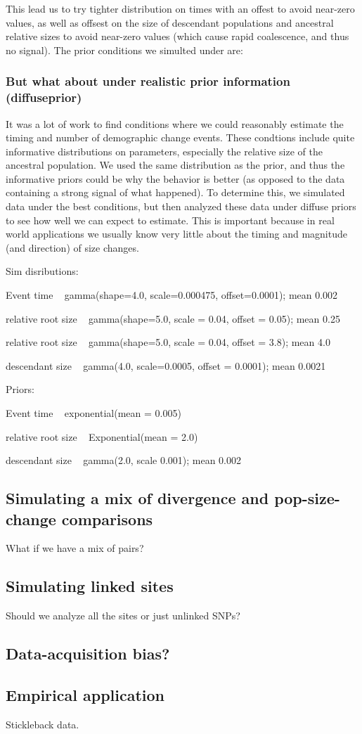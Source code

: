 This lead us to try tighter distribution on times with an offest to avoid
near-zero values, as well as offsest on the size of descendant populations and
ancestral relative sizes to avoid near-zero values (which cause rapid
coalescence, and thus no signal). The prior conditions we simulted under are:


\subsubsection{But what about under realistic prior information (diffuseprior)}

It was a lot of work to find conditions where we could reasonably estimate
the timing and number of demographic change events.
These condtions include quite informative distributions on parameters,
especially the relative size of the ancestral population.
We used the same distribution as the prior, and thus the informative priors
could be why the behavior is better (as opposed to the data containing a strong
signal of what happened).
To determine this, we simulated data under the best conditions,
but then analyzed these data under diffuse priors to see how
well we can expect to estimate.
This is important because in real world applications we usually know very
little about the timing and magnitude (and direction) of size changes.

Sim disributions:

Event time ~ gamma(shape=4.0, scale=0.000475, offset=0.0001); mean 0.002

relative root size ~ gamma(shape=5.0, scale = 0.04, offset = 0.05); mean 0.25

relative root size ~ gamma(shape=5.0, scale = 0.04, offset = 3.8); mean 4.0

descendant size ~ gamma(4.0, scale=0.0005, offset = 0.0001); mean 0.0021

Priors:

Event time ~ exponential(mean = 0.005)

relative root size ~ Exponential(mean = 2.0)

descendant size ~ gamma(2.0, scale 0.001); mean 0.002


\subsection{Simulating a mix of divergence and pop-size-change comparisons}
What if we have a mix of pairs?


\subsection{Simulating linked sites}
Should we analyze all the sites or just unlinked SNPs?


\subsection{Data-acquisition bias?}


\subsection{Empirical application}
Stickleback data.




